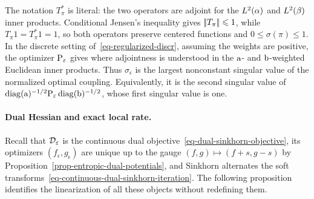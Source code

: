 The notation $T_\pi^*$ is literal: the two operators are adjoint for the $L^2(\al)$ and $L^2(\be)$ inner products. Conditional Jensen's inequality gives $\norm{T_\pi}\leq1$, while $T_\pi1=T_\pi^*1=1$, so both operators preserve centered functions and $0\leq\sigma(\pi)\leq1$. In the discrete setting of~\eqref{eq-regularized-discr}, assuming the weights are positive, the optimizer $\P_\epsilon$ gives
where adjointness is understood in the $\a$- and $\b$-weighted Euclidean inner products. Thus $\sigma_\epsilon$ is the largest nonconstant singular value of the normalized optimal coupling.
Equivalently, it is the second singular value of
\(
	\diag(\a)^{-1/2}\P_\epsilon\diag(\b)^{-1/2}
\),
whose first singular value is one.

\paragraph{Dual Hessian and exact local rate.}

Recall that $\Dd_\epsilon$ is the continuous dual objective~\eqref{eq-dual-sinkhorn-objective}, its optimizers $(f_\epsilon,g_\epsilon)$ are unique up to the gauge $(f,g)\mapsto(f+s,g-s)$ by Proposition~\ref{prop-entropic-dual-potentials}, and Sinkhorn alternates the soft transforms~\eqref{eq-continuous-dual-sinkhorn-iteration}. The following proposition identifies the linearization of all these objects without redefining them.

